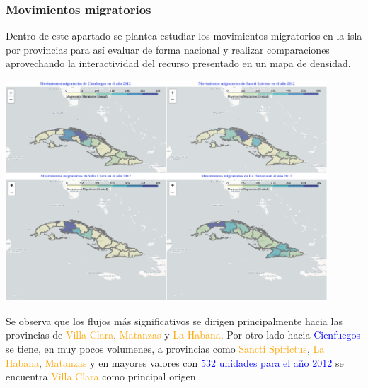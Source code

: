 \documentclass{article}
\begin{document}
\subsubsection{Movimientos migratorios}
Dentro de este apartado se plantea estudiar los movimientos migratorios en la isla por provincias para así evaluar de forma nacional y realizar comparaciones aprovechando la interactividad del recurso presentado en un mapa de densidad.
\begin{center}
    \includegraphics[width=0.9\textwidth]{img/fig3.png}
\end{center}
\newpage
Se observa que los flujos más significativos se dirigen principalmente hacia las provincias de \textcolor{orange}{Villa Clara}, \textcolor{orange}{Matanzas} y \textcolor{orange}{La Habana}. Por otro lado hacia \textcolor{blue}{Cienfuegos} se tiene, en muy pocos volumenes, a provincias como \textcolor{orange}{Sancti Spírictus}, \textcolor{orange}{La Habana}, \textcolor{orange}{Matanzas} y en mayores valores con \textcolor{blue}{532 unidades para el año 2012} se encuentra \textcolor{orange}{Villa Clara} como principal origen.
\end{document}
